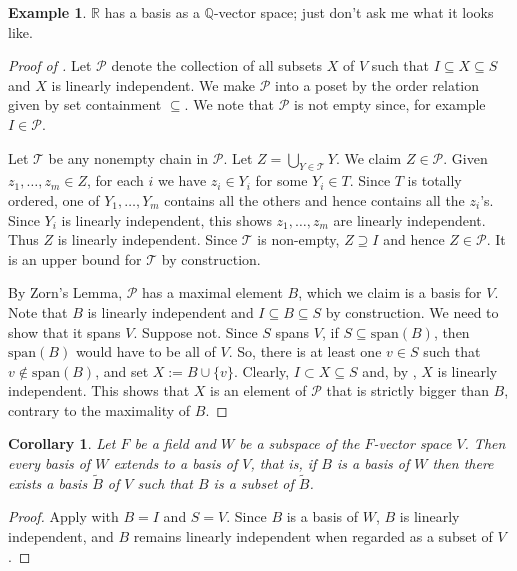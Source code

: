 \documentclass[12pt]{report}
\newtheorem{corollary}[theorem]{Corollary}
\numberwithin{equation}{section}
\numberwithin{theorem}{chapter}
\theoremstyle{definition}
\newtheorem{example}[theorem]{Example}
\newtheorem*{basic properties}{Basic Properties}
\newtheorem*{Important Remark}{Important Remark}
\begin{document}
\begin{example}
$\mathbb{R}$ has a basis as a $\mathbb{Q}$-vector space; just don't ask me what it looks like.
\end{example}


\begin{proof}[Proof of ]
Let $\mathcal{P}$ denote the collection of all subsets $X$ of $V$ such that $I \subseteq X \subseteq S$ and $X$ is linearly independent. We make $\mathcal{P}$ into a poset by the order relation given by set containment $\subseteq$. We note that $\mathcal{P}$ is not empty since, for example $I \in \mathcal{P}$. 

Let $\mathcal{T}$ be any nonempty chain in $\mathcal{P}$. Let $Z = \bigcup_{Y \in \mathcal{T}} Y$. We claim $Z \in \mathcal{P}$. Given  $z_1, \dots, z_m \in Z$, for each $i$ we have $z_i \in Y_i$ for some $Y_i \in T$. Since $T$ is totally ordered, one of $Y_1, \dots, Y_m$ contains all the others and hence contains all the $z_i$'s. 
Since $Y_i$ is linearly independent, this shows $z_1, \dots, z_m$ are linearly independent. Thus $Z$ is linearly independent. Since $\mathcal{T}$ is non-empty, $Z \supseteq I$ and hence $Z \in \mathcal{P}$. It is an upper bound for $\mathcal{T}$ by construction. 

By Zorn's Lemma, $\mathcal{P}$ has a maximal element $B$, which we claim is a basis for $V$. Note that $B$ is linearly independent and  $I \subseteq B \subseteq S$ by construction. We need to show that it spans $V$. Suppose not. Since $S$ spans $V$, if $S \subseteq \mathrm{span}(B)$, then $\mathrm{span}(B)$ would have to be all of $V$. So, there is at least one $v \in S$ such that $v \notin \mathrm{span}(B)$, and set $X := B \cup \{v\}$.
Clearly, $I \subset X \subseteq S$ and, by , $X$ is linearly independent. This shows that $X$ is an element of $\mathcal{P}$ that is strictly bigger than $B$, contrary to the maximality of $B$. 
\end{proof}




\begin{corollary}
Let $F$ be a field and $W$ be a subspace of the $F$-vector space $V$. Then every basis of $W$ extends to a basis of $V$, that is, if $B$ is a basis of $W$ then there exists a basis $\tilde{B}$ of $V$ such that $B$ is a subset of $\tilde{B}$.
\end{corollary}

\begin{proof} 
Apply  with $B = I$ and $S = V$. Since $B$ is a basis of $W$, $B$ is linearly independent, and  $B$ remains linearly independent when regarded as a subset of $V$.
\end{proof}
\end{document}
